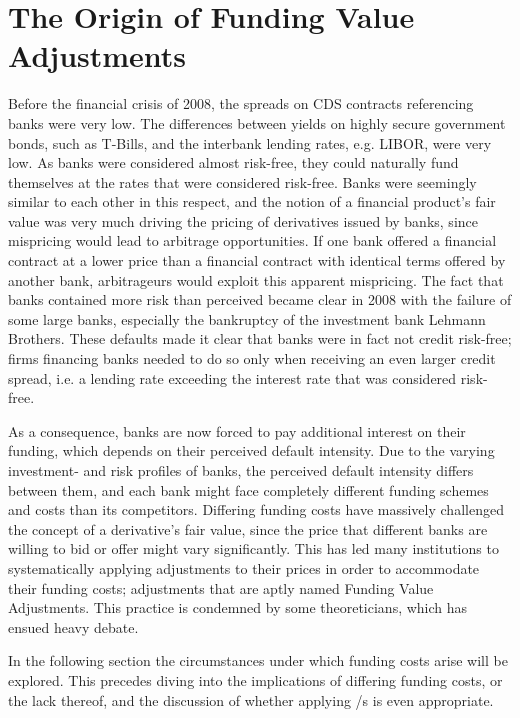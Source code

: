 \documentclass[main.tex]{subfiles}
\begin{document}
    \section{The Origin of Funding Value Adjustments}
        Before the financial crisis of 2008, the spreads on CDS contracts referencing banks were very low.
        The differences between yields on highly secure government bonds, such as T-Bills,
        and the interbank lending rates, e.g. LIBOR, were very low.
        As banks were considered almost risk-free, 
        they could naturally fund themselves at the rates that were considered risk-free.
        Banks were seemingly similar to each other in this respect, 
        and the notion of a financial product's fair value was very much driving the pricing of derivatives issued by banks,
        since mispricing would lead to arbitrage opportunities.
        If one bank offered a financial contract at a lower price than a financial contract with identical terms
        offered by another bank, arbitrageurs would exploit this apparent mispricing. 
        The fact that banks contained more risk than perceived became clear in 2008
        with the failure of some large banks, 
        especially the bankruptcy of the investment bank Lehmann Brothers.
        These defaults made it clear that banks were in fact not credit risk-free; 
        firms financing banks needed to do so only when receiving an even larger credit spread,
        i.e. a lending rate exceeding the interest rate that was considered risk-free. 
        
        As a consequence, banks are now forced to pay additional interest on their funding, 
        which depends on their perceived default intensity.
        Due to the varying investment- and risk profiles of banks, 
        the perceived default intensity differs between them, 
        and each bank might face completely different funding schemes and costs than its competitors.
        Differing funding costs have massively challenged the concept of a derivative's fair value,
        since the price that different banks are willing to bid or offer might vary significantly. 
        This has led many institutions to systematically applying adjustments to their prices
        in order to accommodate their funding costs; 
        adjustments that are aptly named Funding Value Adjustments. 
        This practice is condemned by some theoreticians, 
        which has ensued heavy debate.
        
        In the following section the circumstances under which funding costs arise will be explored.
        This precedes diving into the implications of differing funding costs, or the lack thereof,
        and the discussion of whether applying \FVA/s is even appropriate.
\end{document}

